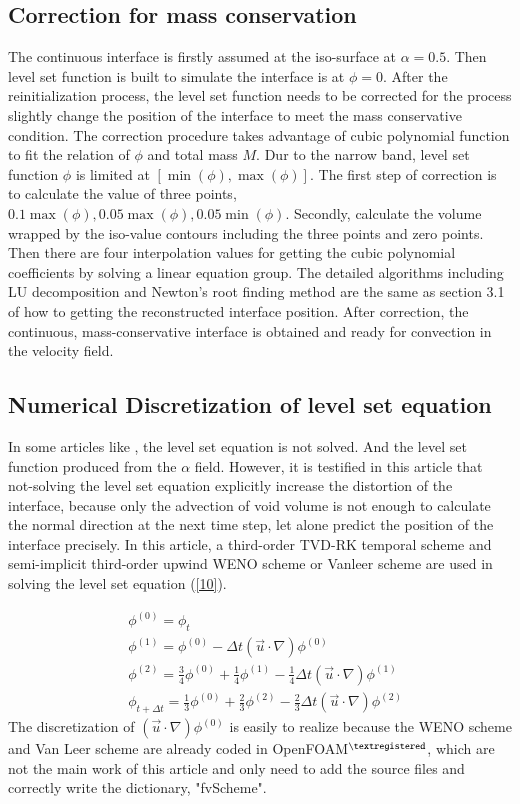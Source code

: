 \subsection{Correction for mass conservation}
The continuous interface is firstly assumed at the iso-surface at $\alpha=0.5$. Then level set function is built to simulate the interface is at $\phi=0$. After the reinitialization process, the level set function needs to be corrected for the process slightly change the position of the interface to meet the mass conservative condition. The correction procedure takes advantage of cubic polynomial function to fit the relation of $\phi$ and total mass $M$. Dur to the narrow band, level set function $\phi$ is limited at $[\min(\phi),\max(\phi)]$. The first step of correction is to calculate the value of three points,$0.1\max(\phi),0.05\max(\phi),0.05\min(\phi)$. Secondly, calculate the volume wrapped by the iso-value contours including the three points and zero points. Then there are four interpolation values for getting the cubic polynomial coefficients by solving a linear equation group. The detailed algorithms including LU decomposition and Newton's root finding method are the same as section 3.1 of how to getting the reconstructed interface position. After correction, the continuous, mass-conservative interface is obtained and ready for convection in the velocity field. 

\subsection{Numerical Discretization of level set equation}
In some articles like \cite{sun2010coupled,WANG201370}, the level set equation is not solved. And the level set function produced from the $\alpha$ field. However, it is testified in this article that not-solving the level set equation explicitly increase the distortion of the interface, because only the advection of void volume is not enough to calculate the normal direction at the next time step, let alone predict the position of the interface precisely. In this article, a third-order TVD-RK temporal scheme and semi-implicit third-order upwind WENO scheme or Vanleer scheme are used in solving the level set equation (\ref{10}).

\begin{equation}\label{26}
\begin{split}
&\phi^{(0)}=\phi_t\\
&\phi^{(1)}=\phi^{(0)}-\Delta{t}(\vec{u}\cdot\nabla)\phi^{(0)}\\
&\phi^{(2)}=\frac{3}{4}\phi^{(0)}+\frac{1}{4}\phi^{(1)}-\frac{1}{4}\Delta{t}(\vec{u}\cdot\nabla)\phi^{(1)}\\
&\phi_{t+\Delta{t}}=\frac{1}{3}\phi^{(0)}+\frac{2}{3}\phi^{(2)}-\frac{2}{3}\Delta{t}(\vec{u}\cdot\nabla)\phi^{(2)}
\end{split}
\end{equation}
The discretization of $(\vec{u}\cdot\nabla)\phi^{(0)}$ is easily to realize because the WENO scheme and Van Leer scheme are already coded in OpenFOAM$^{\textregistered}$, which are not the main work of this article and only need to add the source files and correctly write the dictionary, "fvScheme". 
